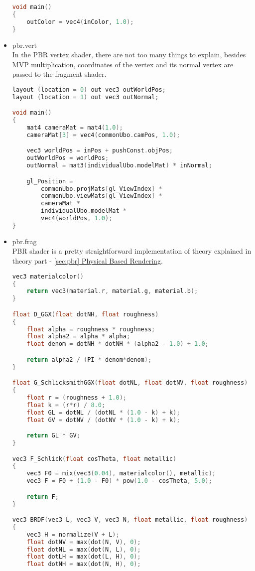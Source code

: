\begin{itemize}
\begin{lstlisting}[language=c++, caption=Normal lighting fragment shader (./assets/shaders/normal\_lighting.frag)]
void main()
{
    outColor = vec4(inColor, 1.0);
}
\end{lstlisting}
    \item pbr.vert\\
    In the PBR vertex shader, there are not too many things to explain, besides MVP multiplication, coordinates of the vertex and its normal vertex are passed to the fragment shader. 
\begin{lstlisting}[language=c++, caption=PBR vertex shader (./assets/shaders/pbr.vert)]
layout (location = 0) out vec3 outWorldPos;
layout (location = 1) out vec3 outNormal;

void main()
{
    mat4 cameraMat = mat4(1.0);
    cameraMat[3] = vec4(commonUbo.camPos, 1.0);

    vec3 worldPos = inPos + pushConst.objPos;
    outWorldPos = worldPos;
    outNormal = mat3(individualUbo.modelMat) * inNormal;

    gl_Position =
        commonUbo.projMats[gl_ViewIndex] *
        commonUbo.viewMats[gl_ViewIndex] *
        cameraMat *
        individualUbo.modelMat *
        vec4(worldPos, 1.0);
}
\end{lstlisting}
    \item pbr.frag\\
    PBR shader is a pretty straightforward implementation of theory explained in theory part - \hyperref[sec:pbr]{\ref*{sec:pbr} Physical Based Rendering}.
\begin{lstlisting}[language=c++, caption=PBR fragment shader(./assets/shaders/pbr.frag)]
vec3 materialcolor()
{
    return vec3(material.r, material.g, material.b);
}

float D_GGX(float dotNH, float roughness)
{
    float alpha = roughness * roughness;
    float alpha2 = alpha * alpha;
    float denom = dotNH * dotNH * (alpha2 - 1.0) + 1.0;

    return alpha2 / (PI * denom*denom);
}

float G_SchlicksmithGGX(float dotNL, float dotNV, float roughness)
{
    float r = (roughness + 1.0);
    float k = (r*r) / 8.0;
    float GL = dotNL / (dotNL * (1.0 - k) + k);
    float GV = dotNV / (dotNV * (1.0 - k) + k);

    return GL * GV;
}

vec3 F_Schlick(float cosTheta, float metallic)
{
    vec3 F0 = mix(vec3(0.04), materialcolor(), metallic);
    vec3 F = F0 + (1.0 - F0) * pow(1.0 - cosTheta, 5.0);

    return F;
}

vec3 BRDF(vec3 L, vec3 V, vec3 N, float metallic, float roughness)
{
    vec3 H = normalize(V + L);
    float dotNV = max(dot(N, V), 0);
    float dotNL = max(dot(N, L), 0);
    float dotLH = max(dot(L, H), 0);
    float dotNH = max(dot(N, H), 0);


\end{lstlisting}
\end{itemize}
